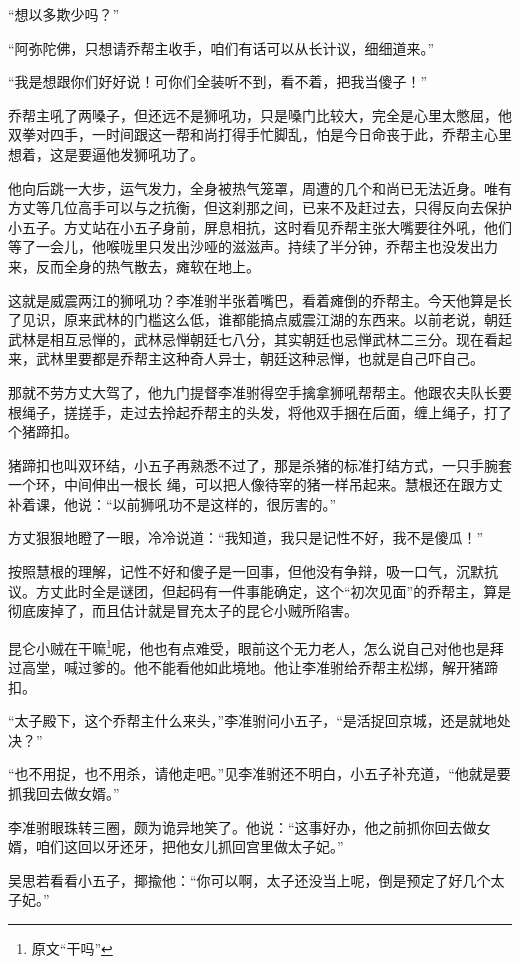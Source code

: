 “想以多欺少吗？”

“阿弥陀佛，只想请乔帮主收手，咱们有话可以从长计议，细细道来。”

“我是想跟你们好好说！可你们全装听不到，看不着，把我当傻子！”

乔帮主吼了两嗓子，但还远不是狮吼功，只是嗓门比较大，完全是心里太憋屈，他双拳对四手，一时间跟这一帮和尚打得手忙脚乱，怕是今日命丧于此，乔帮主心里想着，这是要逼他发狮吼功了。

他向后跳一大步，运气发力，全身被热气笼罩，周遭的几个和尚已无法近身。唯有方丈等几位高手可以与之抗衡，但这刹那之间，已来不及赶过去，只得反向去保护小五子。方丈站在小五子身前，屏息相抗，这时看见乔帮主张大嘴要往外吼，他们等了一会儿，他喉咙里只发出沙哑的滋滋声。持续了半分钟，乔帮主也没发出力来，反而全身的热气散去，瘫软在地上。

这就是威震两江的狮吼功？李准驸半张着嘴巴，看着瘫倒的乔帮主。今天他算是长了见识，原来武林的门槛这么低，谁都能搞点威震江湖的东西来。以前老说，朝廷武林是相互忌惮的，武林忌惮朝廷七八分，其实朝廷也忌惮武林二三分。现在看起来，武林里要都是乔帮主这种奇人异士，朝廷这种忌惮，也就是自己吓自己。

那就不劳方丈大驾了，他九门提督李准驸得空手擒拿狮吼帮帮主。他跟农夫队长要根绳子，搓搓手，走过去拎起乔帮主的头发，将他双手捆在后面，缠上绳子，打了个猪蹄扣。

猪蹄扣也叫双环结，小五子再熟悉不过了，那是杀猪的标准打结方式，一只手腕套一个环，中间伸出一根长
绳，可以把人像待宰的猪一样吊起来。慧根还在跟方丈补着课，他说：“以前狮吼功不是这样的，很厉害的。”

方丈狠狠地瞪了一眼，冷冷说道：“我知道，我只是记性不好，我不是傻瓜！”

按照慧根的理解，记性不好和傻子是一回事，但他没有争辩，吸一口气，沉默抗议。方丈此时全是谜团，但起码有一件事能确定，这个“初次见面”的乔帮主，算是彻底废掉了，而且估计就是冒充太子的昆仑小贼所陷害。

昆仑小贼在干嘛\footnote{原文“干吗”}呢，他也有点难受，眼前这个无力老人，怎么说自己对他也是拜过高堂，喊过爹的。他不能看他如此境地。他让李准驸给乔帮主松绑，解开猪蹄扣。

“太子殿下，这个乔帮主什么来头，”李准驸问小五子，“是活捉回京城，还是就地处决？”

“也不用捉，也不用杀，请他走吧。”见李准驸还不明白，小五子补充道，“他就是要抓我回去做女婿。”

李准驸眼珠转三圈，颇为诡异地笑了。他说：“这事好办，他之前抓你回去做女婿，咱们这回以牙还牙，把他女儿抓回宫里做太子妃。”

吴思若看看小五子，揶揄他：“你可以啊，太子还没当上呢，倒是预定了好几个太子妃。”

